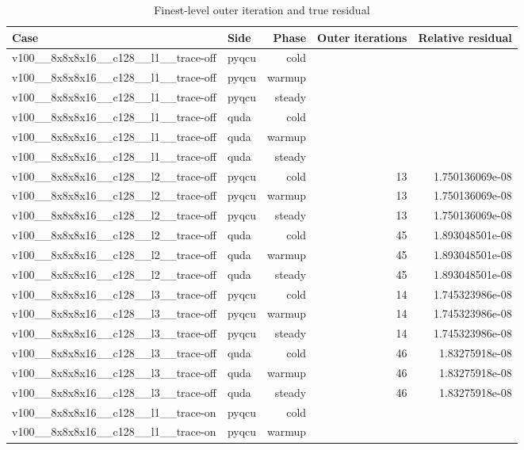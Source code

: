 \begin{table}[htbp]
\centering
\caption{Finest-level outer iteration and true residual}
\small
\begin{tabular}{@{}llrrr@{}}
\toprule
Case & Side & Phase & Outer iterations & Relative residual \\
\midrule
v100\_\_8x8x8x16\_\_c128\_\_l1\_\_trace-off & pyqcu & cold &  &  \\
v100\_\_8x8x8x16\_\_c128\_\_l1\_\_trace-off & pyqcu & warmup &  &  \\
v100\_\_8x8x8x16\_\_c128\_\_l1\_\_trace-off & pyqcu & steady &  &  \\
v100\_\_8x8x8x16\_\_c128\_\_l1\_\_trace-off & quda & cold &  &  \\
v100\_\_8x8x8x16\_\_c128\_\_l1\_\_trace-off & quda & warmup &  &  \\
v100\_\_8x8x8x16\_\_c128\_\_l1\_\_trace-off & quda & steady &  &  \\
v100\_\_8x8x8x16\_\_c128\_\_l2\_\_trace-off & pyqcu & cold & 13 & 1.750136069e-08 \\
v100\_\_8x8x8x16\_\_c128\_\_l2\_\_trace-off & pyqcu & warmup & 13 & 1.750136069e-08 \\
v100\_\_8x8x8x16\_\_c128\_\_l2\_\_trace-off & pyqcu & steady & 13 & 1.750136069e-08 \\
v100\_\_8x8x8x16\_\_c128\_\_l2\_\_trace-off & quda & cold & 45 & 1.893048501e-08 \\
v100\_\_8x8x8x16\_\_c128\_\_l2\_\_trace-off & quda & warmup & 45 & 1.893048501e-08 \\
v100\_\_8x8x8x16\_\_c128\_\_l2\_\_trace-off & quda & steady & 45 & 1.893048501e-08 \\
v100\_\_8x8x8x16\_\_c128\_\_l3\_\_trace-off & pyqcu & cold & 14 & 1.745323986e-08 \\
v100\_\_8x8x8x16\_\_c128\_\_l3\_\_trace-off & pyqcu & warmup & 14 & 1.745323986e-08 \\
v100\_\_8x8x8x16\_\_c128\_\_l3\_\_trace-off & pyqcu & steady & 14 & 1.745323986e-08 \\
v100\_\_8x8x8x16\_\_c128\_\_l3\_\_trace-off & quda & cold & 46 & 1.83275918e-08 \\
v100\_\_8x8x8x16\_\_c128\_\_l3\_\_trace-off & quda & warmup & 46 & 1.83275918e-08 \\
v100\_\_8x8x8x16\_\_c128\_\_l3\_\_trace-off & quda & steady & 46 & 1.83275918e-08 \\
v100\_\_8x8x8x16\_\_c128\_\_l1\_\_trace-on & pyqcu & cold &  &  \\
v100\_\_8x8x8x16\_\_c128\_\_l1\_\_trace-on & pyqcu & warmup &  &  \\

\end{tabular}
\end{table}
